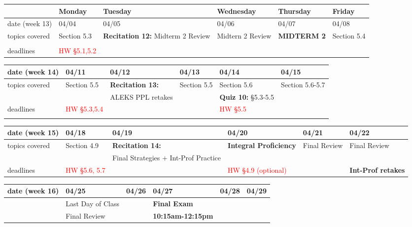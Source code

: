 \documentclass[11pt,fleqn]{article}
\begin{document}
\begin{tabularx}{\textwidth}{|X|| X | X | X | X | X |}
\hline
&Monday & Tuesday & Wednesday & Thursday & Friday \\
\hline 
\hline
\rowcolor{gray!20}
date (week 13)&04/04&04/05&04/06&04/07&04/08\\ \hline
topics covered&Section 5.3&\textbf{Recitation 12:} Midterm 2 Review&Midtern 2 Review&\textcolor{dcyan}{\textbf{MIDTERM 2}}&Section 5.4\\ 
&&&&&\\ \hline
deadlines&\textcolor{red}{HW \S 5.1,5.2}&&&& \\  \hline
\end{tabularx}
\vfill
\begin{tabularx}{\textwidth}{|X|| X | X | X | X | X |}
\hline
\rowcolor{gray!20}
date (week 14)&04/11&04/12&04/13&04/14&04/15\\ \hline
topics covered&Section 5.5&\textbf{Recitation 13:}&Section 5.5&Section 5.6&Section 5.6-5.7\\ 
&&ALEKS PPL retakes&&\textbf{Quiz 10:} \S5.3-5.5&\\ \hline
deadlines&\textcolor{red}{HW \S 5.3,5.4}&&&\textcolor{red}{HW \S 5.5}& \\  \hline\\ \hline 
\end{tabularx}
\vfill
\begin{tabularx}{\textwidth}{|X|| X | X | X | X | X |}
\hline
\rowcolor{gray!20}
date (week 15)&04/18&04/19&04/20&04/21&04/22\\ \hline
topics covered&Section 4.9&\textbf{Recitation 14:}&\textcolor{dcyan}{\textbf{Integral Proficiency}}&Final Review&Final Review\\ 
&&Final Strategies $+$ Int-Prof Practice&&&\\ 
\hline
deadlines&\textcolor{red}{HW \S 5.6, 5.7}&&\textcolor{red}{HW \S4.9 (optional)}&&\textcolor{dcyan}{\textbf{Int-Prof retakes}} \\ \hline 
\end{tabularx}
\vfill
\begin{tabularx}{\textwidth}{|X|| X | X | X | X | X |}
\hline
\rowcolor{gray!20}
date (week 16)&04/25&04/26&04/27&04/28&04/29\\ \hline
&Last Day of Class&&\textcolor{dcyan}{\textbf{Final Exam}}&&\\ 
&Final Review&&\textcolor{dcyan}{\textbf{10:15am-12:15pm}}&&\\ \hline
\end{tabularx}
\vfill

\quad

\vspace{3in}

\quad
\end{document}
